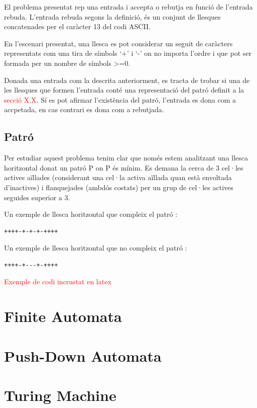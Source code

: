\documentclass[12pt,a4paper]{report}
\begin{document}
\begin{multicols}{2}

El problema presentat rep una entrada i accepta o rebutja en funció de l’entrada rebuda. L’entrada rebuda segons la definició, és un conjunt de llesques concatenades per el caràcter 13 del codi ASCII. 

En l’escenari presentat, una llesca es pot considerar un seguit de caràcters representats com una tira de símbols ‘+’ i ‘-’ on no importa l’ordre i que pot ser formada per un nombre de símbols >=0.

Donada una entrada com la descrita anteriorment, es tracta de trobar si una de les llesques que formen l’entrada conté una representació del patró definit a la \textcolor{red}{secció X.X}. Sí es pot afirmar l’existència del patró, l’entrada es dona com a accpetada, en cas contrari es dona com a rebutjada.
\end{multicols}

\section{Patró}

\begin{multicols}{2}

Per estudiar aquest problema tenim clar que només estem analitzant una llesca horitzontal donat un patró P on P és mínim. Es demana la cerca de 3 cel·les actives aïllades (considerant una cel·la activa aïllada quan està envoltada d’inactives) i flanquejades (ambdós costats) per un grup de cel·les actives seguides superior a 3.

\end{multicols}

Un exemple de llesca horitzontal que compleix el patró : 

\begin{lstlisting}[columns=fullflexible]
++++-+-+-+-++++ 
\end{lstlisting}

Un exemple de llesca horitzontal que no compleix el patró : 

\begin{lstlisting}[columns=fullflexible]
++++-+---+-++++ 
\end{lstlisting}

\clearpage

\textcolor{red}{Exemple de codi incrustat en latex}



\chapter{Finite Automata}

\chapter{Push-Down Automata}

\chapter{Turing Machine}
 
\printindex
\end{document}
